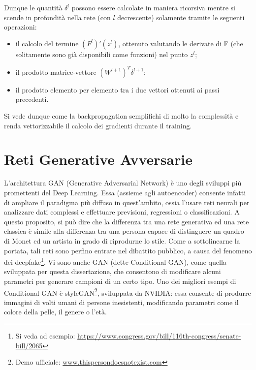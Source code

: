 \documentclass[Lau, noexaminfo, oneside]{sapthesis} %
\begin{document}
Dunque le quantità $\delta^l$ possono essere calcolate in maniera ricorsiva mentre si scende in profondità nella rete (con $l$ decrescente) solamente tramite le seguenti operazioni:
\begin{itemize}
\item il calcolo del termine $(F^l)'(z^l)$, ottenuto valutando le derivate di F (che solitamente sono già disponibili come funzioni) nel punto $z^l$;
\item il prodotto matrice-vettore $(W^{l+1})^T \delta^{l+1}$;
\item il prodotto elemento per elemento tra i due vettori ottenuti ai passi precedenti.
\end{itemize}
Si vede dunque come la backpropagation semplifichi di molto la complessità e renda vettorizzabile il calcolo dei gradienti durante il training.\cite{nielsenneural}
\chapter{Reti Generative Avversarie}
L'architettura GAN (Generative Adversarial Network) è uno degli sviluppi più promettenti del Deep Learning. 
Essa (assieme agli autoencoder) consente infatti di ampliare il paradigma più diffuso in quest'ambito, ossia l'usare reti neurali per analizzare dati complessi e effettuare previsioni, regressioni o classificazioni. A questo proposito, si può dire che la differenza tra una rete generativa ed una rete classica è simile alla differenza tra una persona capace di distinguere un quadro di Monet ed un artista in grado di riprodurne lo stile. Come a sottolinearne la portata, tali reti sono perfino entrate nel dibattito pubblico, a causa del fenomeno dei deepfake\footnote{Si veda ad esempio: \url{https://www.congress.gov/bill/116th-congress/senate-bill/2065}}. 
Vi sono anche GAN (dette Conditional GAN), come quella sviluppata per questa dissertazione, che consentono di modificare alcuni parametri per generare campioni di un certo tipo.
Uno dei migliori esempi di Conditional GAN è styleGAN\footnote{Demo ufficiale: \url{www.thispersondoesnotexist.com}}, sviluppata da NVIDIA: essa consente di produrre immagini di volti umani di persone inesistenti, modificando parametri come il colore della pelle, il genere o l'età.\cite{stylegan}\\
\end{document}
